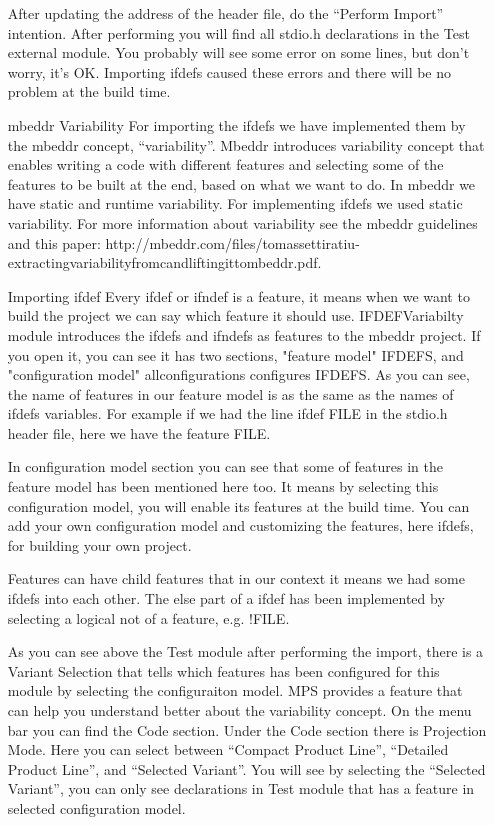 \documentclass{article}
\begin{document}
\begin{itemize}
After updating the address of the header file, do the “Perform Import” intention. After performing you will find all stdio.h declarations in the Test external module. You probably will see some error on some lines, but don't worry, it's OK. Importing ifdefs caused these errors and there will be no problem at the build time.

\item[mbeddr Variability]
For importing the ifdefs we have implemented them by the mbeddr concept, “variability”. Mbeddr introduces variability concept that enables writing a code with different features and selecting some of the features to be built at the end, based on what we want to do. In mbeddr we have static and runtime variability. For implementing ifdefs we used static variability. For more information about variability see the mbeddr guidelines and this paper: http://mbeddr.com/files/tomassettiratiu-extractingvariabilityfromcandliftingittombeddr.pdf.

\item[Importing ifdef]
Every ifdef or ifndef is a feature, it means when we want to build the project we can say which feature it should use. IFDEFVariabilty module introduces the ifdefs and ifndefs as features to the mbeddr project. If you open it, you can see it has two sections, "feature model" IFDEFS, and "configuration model" allconfigurations configures IFDEFS. As you can see, the name of features in our feature model is as the same as the names of ifdefs variables. For example if we had the line ifdef FILE in the stdio.h header file, here we have the feature FILE.

In configuration model section you can see that some of features in the feature model has been mentioned here too. It means by selecting this configuration model, you will enable its features at the build time. You can add your own configuration model and customizing the features, here ifdefs, for building your own project.

Features can have child features that in our context it means we had some ifdefs into each other. The else part of a ifdef has been implemented by selecting a logical not of a feature, e.g. {!FILE}.

As you can see above the Test module after performing the import, there is a Variant Selection that tells which features has been configured for this module by selecting the configuraiton model. MPS provides a feature that can help you understand better about the variability concept. On the menu bar you can find the Code section. Under the Code section there is Projection Mode. Here you can select between “Compact Product Line”, “Detailed Product Line”, and “Selected Variant”. You will see by selecting the “Selected Variant”, you can only see declarations in Test module that has a feature in selected configuration model.


\end{itemize}
\end{document}
